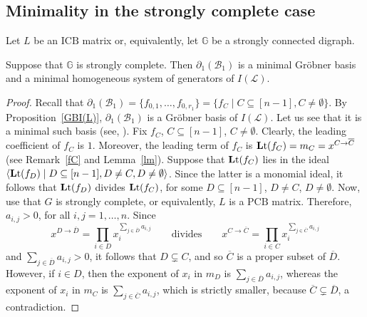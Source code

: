 \documentclass[ALCO]{cedram}
\newcommand{\mbg}{\mbox{$\mathbb{G}$}}
\newcommand{\lt}{\mbox{${\bf L}{\rm t}$}}
\newcommand{\mcb}{\mbox{$\mathcal{B}$}}
\newcommand{\mcl}{\mbox{$\mathcal{L}$}}
\newcommand{\icb}{\mbox{$\mathrm{ICB}$}}
\newcommand{\pcb}{\mbox{$\mathrm{PCB}$}}
\newcommand{\dif}{\mbox{$\partial$}}
\begin{document}
\subsection{Minimality in the strongly complete case}

 Let $L$ be an $\icb$ matrix or, equivalently, let $\mbg$ be
a strongly connected digraph.

\begin{proposition}\label{minGB}
Suppose that $\mbg$ is strongly complete. Then $\dif_1(\mcb_1)$ is a
minimal Gr\"obner basis and a minimal homogeneous system of generators
of $I(\mcl)$.
\end{proposition}
\begin{proof}
Recall that $\dif_1(\mcb_1)=\{f_{0,1},\ldots ,f_{0,r_1}\}=\{f_C\mid
C\subseteq [n-1], C\neq\emptyset \}$. By Proposition~\ref{GBI(L)},
$\dif_1(\mcb_1)$ is a Gr\"obner basis of $I(\mcl)$. Let us see that it
is a minimal such basis (see, \eg
\cite[\S~2.7. Definition~4]{clo}). Fix $f_C$, $C\subseteq [n-1]$,
$C\neq\emptyset$. Clearly, the leading coefficient of $f_C$ is
$1$. Moreover, the leading term of $f_C$ is
$\lt(f_C)=m_C=x^{C\to\overline{C}}$ (see Remark~\ref{fC} and
Lemma~\ref{lm}). Suppose that $\lt(f_C)$ lies in the ideal
$\langle\lt(f_D)\mid D\subseteq [n-1], D\neq C, D\neq
\emptyset\rangle$. Since the latter is a monomial ideal, it follows
that $\lt(f_D)$ divides $\lt(f_C)$, for some $D\subseteq [n-1]$,
$D\neq C$, $D\neq\emptyset$. Now, use that $G$ is strongly complete,
or equivalently, $L$ is a $\pcb$ matrix. Therefore, $a_{i,j}>0$, for
all $i,j=1,\ldots ,n$. Since
\[
x^{D\to\overline{D}}=\prod_{i\in
  D}x_i^{\sum_{j\in\overline{D}}a_{i,j}}\qquad\text{divides}\qquad
x^{C\to\overline{C}}=\prod_{i\in
  C}x_i^{\sum_{j\in\overline{C}}a_{i,j}}
\]
and $\sum_{j\in\overline{D}}a_{i,j}>0$, it follows that $D\subsetneq C$,
and so $\overline{C}$ is a proper subset of $\overline{D}$. However,
if $i\in D$, then the exponent of $x_i$ in $m_D$ is
$\sum_{j\in\overline{D}}a_{i,j}$, whereas the exponent of $x_i$ in
$m_C$ is $\sum_{j\in\overline{C}}a_{i,j}$, which is strictly smaller,
because $\overline{C}\subsetneq \overline{D}$, a contradiction.


\end{proof}
\end{document}
